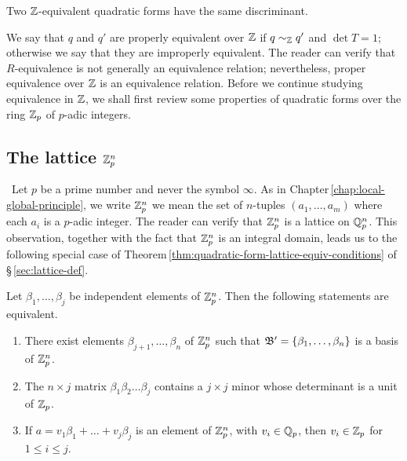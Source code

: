 \begin{theorem}{\normalfont\cite[p.\,127]{cassels2008rational}} Two
    \(\mathbb{Z}\)-equivalent quadratic forms have the same discriminant.
\end{theorem}

We say that \(q\) and \(q'\) are properly equivalent over \(\mathbb{Z}\) if \(q
\sim_{\mathbb{Z}} q'\) and \(\det T = 1\); otherwise we say that they are
improperly equivalent. The reader can verify that \(R\)-equivalence is not
generally an equivalence relation; nevertheless, proper equivalence over
\(\mathbb{Z}\) is an equivalence relation. Before we continue studying
equivalence in \(\mathbb{Z}\), we shall first review some properties of quadratic
forms over the ring \(\mathbb{Z}_p\) of \(p\)-adic integers.

\subsection{The lattice \(\mathbb{Z}_p^n\)}~Let \(p\) be a prime number and never
the symbol \(\infty\). As in Chapter\,\ref{chap:local-global-principle}, we
write \(\mathbb{Z}_p^n\) we mean the set of \(n\)-tuples \((a_1, \dots, a_m)\)
where each \(a_i\) is a \(p\)-adic integer. The reader can verify that
\(\mathbb{Z}_p^n\) is a lattice on \(\mathbb{Q}_p^n\). This observation, together
with the fact that \(\mathbb{Z}_p^n\) is an integral domain, leads us to the
following special case of
Theorem\,\ref{thm:quadratic-form-lattice-equiv-conditions} of
\S\,\ref{sec:lattice-def}.\label{sec:the-lattice-zpn}

\begin{theorem}
    {\normalfont\cite[p.\,112]{cassels2008rational}} Let \(\beta_1, \dots,
    \beta_j\) be independent elements of \(\mathbb{Z}_p^n\). Then the following
    statements are equivalent.

    \medskip

    \begin{enumerate}[nosep, label=(\alph*)]
        \item There exist elements \(\beta_{j+1}, \dots, \beta_n\) of
        \(\mathbb{Z}_p^n\) such that \(\mathfrak{B}' = \{\beta_1, \dots, \beta_n\}\) is
        a basis of \(\mathbb{Z}_p^n\).
        \item The \(n \times j\) matrix \(\beta_1 \beta_2 \dots \beta_j\)
        contains a \(j \times j\) minor whose determinant is a unit of
        \(\mathbb{Z}_p\).
        \item If \(a = v_1\beta_1 + \dots + v_j\beta_j\) is an element of
        \(\mathbb{Z}_p^n\), with \(v_i \in \mathbb{Q}_p\), then \(v_i \in
        \mathbb{Z}_p\) for \(1 \leq i \leq j\).
    \end{enumerate}
\end{theorem}

